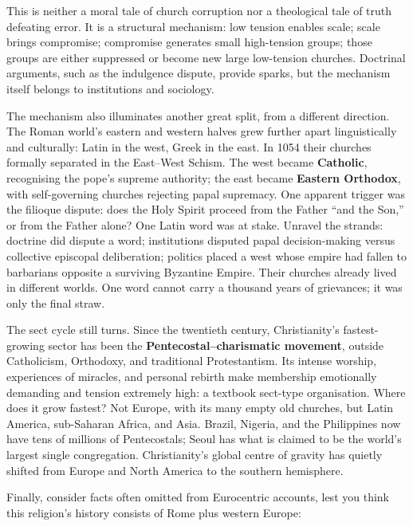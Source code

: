 This is neither a moral tale of church corruption nor a theological tale of truth defeating error. It is a structural mechanism: low tension enables scale; scale brings compromise; compromise generates small high-tension groups; those groups are either suppressed or become new large low-tension churches. Doctrinal arguments, such as the indulgence dispute, provide sparks, but the mechanism itself belongs to institutions and sociology.

The mechanism also illuminates another great split, from a different direction. The Roman world's eastern and western halves grew further apart linguistically and culturally: Latin in the west, Greek in the east. In 1054 their churches formally separated in the East--West Schism. The west became \textbf{Catholic}, recognising the pope's supreme authority; the east became \textbf{Eastern Orthodox}, with self-governing churches rejecting papal supremacy. One apparent trigger was the filioque dispute: does the Holy Spirit proceed from the Father ``and the Son,'' or from the Father alone? One Latin word was at stake. Unravel the strands: doctrine did dispute a word; institutions disputed papal decision-making versus collective episcopal deliberation; politics placed a west whose empire had fallen to barbarians opposite a surviving Byzantine Empire. Their churches already lived in different worlds. One word cannot carry a thousand years of grievances; it was only the final straw.

The sect cycle still turns. Since the twentieth century, Christianity's fastest-growing sector has been the \textbf{Pentecostal--charismatic movement}, outside Catholicism, Orthodoxy, and traditional Protestantism. Its intense worship, experiences of miracles, and personal rebirth make membership emotionally demanding and tension extremely high: a textbook sect-type organisation. Where does it grow fastest? Not Europe, with its many empty old churches, but Latin America, sub-Saharan Africa, and Asia. Brazil, Nigeria, and the Philippines now have tens of millions of Pentecostals; Seoul has what is claimed to be the world's largest single congregation. Christianity's global centre of gravity has quietly shifted from Europe and North America to the southern hemisphere.

Finally, consider facts often omitted from Eurocentric accounts, lest you think this religion's history consists of Rome plus western Europe:

